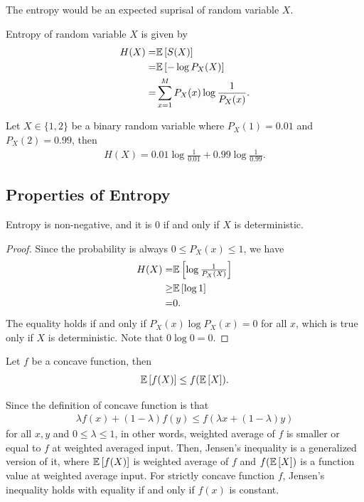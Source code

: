 \documentclass{article}
\begin{document}
The entropy would be an expected suprisal of random variable $X$.
\begin{definition}
    Entropy of random variable $X$ is given by
    \begin{align}
        H(X) =& \Expec{S(X)}\\
        =& \Expec{-\log P_X(X)}\\
        =& \sum_{x=1}^M P_X(x) \log \frac{1}{P_X(x)}.
    \end{align}
\end{definition}

\begin{example}
    Let $X\in\{1, 2\}$ be a binary random variable where $P_X(1) = 0.01$ and $P_X(2) = 0.99$, then
    \begin{align}
        H(X) = 0.01 \log \frac{1}{0.01} + 0.99 \log \frac{1}{0.99}.
    \end{align}
\end{example}

\subsection{Properties of Entropy}
\begin{theorem}
    Entropy is non-negative, and it is 0 if and only if $X$ is deterministic.
\end{theorem}
\begin{proof}
    Since the probability is always $0\leq P_X(x)\leq 1$, we have
    \begin{align}
        H(X) =& \Expec{\log \frac{1}{P_{X}(X)}}\\
        \geq & \Expec{\log 1}\\
        =& 0.
    \end{align}
    The equality holds if and only if $P_X(x)\log P_X(x) = 0$ for all $x$,
    which is true only if $X$ is deterministic.
    Note that $0\log 0 = 0$.
\end{proof}

\begin{theorem}
Let $f$ be a concave function, then
\begin{align}
    \Expec{f(X)} \leq f(\Expec{X}).
\end{align}
\end{theorem}
Since the definition of concave function is that
\begin{align}
    \lambda f(x) + (1-\lambda) f(y) \leq f(\lambda x + (1-\lambda) y)
\end{align}
for all $x, y$ and $0\leq \lambda \leq 1$,
in other words, weighted average of $f$ is smaller or equal to $f$ at weighted averaged input.
Then, Jensen's inequality is a generalized version of it,
where $\Expec{f(X)}$ is weighted average of $f$ and $f(\Expec{X})$ is a function value at weighted average input.
For strictly concave function $f$, Jensen's inequality holds with equality if and only if $f(x)$ is constant.
\end{document}
